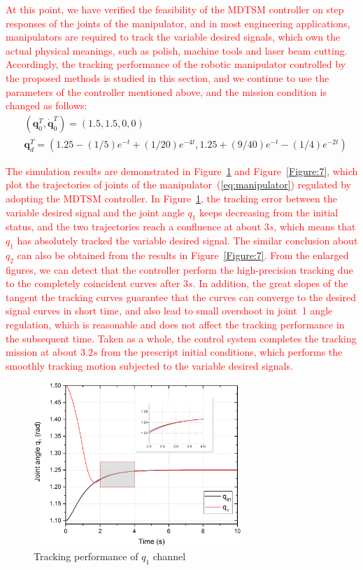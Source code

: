 \documentclass[3p]{elsarticle}
\theoremstyle{plain}
\theoremstyle{remark}
\begin{document}
\textcolor{red}{At this point, we have verified the feasibility of the MDTSM controller on step responses of the joints of the manipulator, and in most engineering applications, manipulators are required to track the variable desired signals, which own the actual physical meanings, such as polish, machine tools and laser beam cutting. Accordingly, the tracking performance of the robotic manipulator controlled by the proposed methods is studied in this section, and we continue to use the parameters of the controller mentioned above, and the mission condition is changed as follows:}
\begin{align*}
&(\bm q_0^T, \dot{\bm q}_0^T)= (1.5,1.5,0,0)\\
&{\bm q}_d^T=(1.25-(1/5)e^{-t}+(1/20)e^{-4t},1.25+(9/40)e^{-t}-(1/4)e^{-2t})
\end{align*}\par
 \textcolor{red}{The simulation results are demonstrated in Figure~\ref{Figure:6} and Figure~\ref{Figure:7}, which plot the trajectories of joints of the manipulator~(\ref{eq:manipulator}) regulated by adopting the MDTSM controller. In Figure~\ref{Figure:6}, the tracking error between the variable desired signal and the joint angle $q_1$ keeps decreasing from the initial status, and the two trajectories reach a confluence at about $3s$, which means that $q_1$ has absolutely tracked the variable desired signal. The similar conclusion about $q_2$ can also be obtained from the results in Figure~\ref{Figure:7}. From the enlarged figures, we can detect that the controller perform the high-precision tracking due to the completely coincident curves after $3s$. In addition, the great slopes of the tangent the tracking curves guarantee that the curves can converge to the desired signal curves in short time, and also lead to small overshoot in joint~1 angle regulation, which is reasonable and does not affect the tracking performance in the subsequent time. Taken as a whole, the control system completes the tracking mission at about $3.2s$ from the prescript initial conditions, which performs the smoothly tracking motion subjected to the variable desired signals.}
\begin{figure}[http]
\centering
\includegraphics[width=0.7\textwidth]{paper3_fig6.eps}
\caption{Tracking performance of $q_1$ channel}
\label{Figure:6}
\end{figure}
\end{document}
